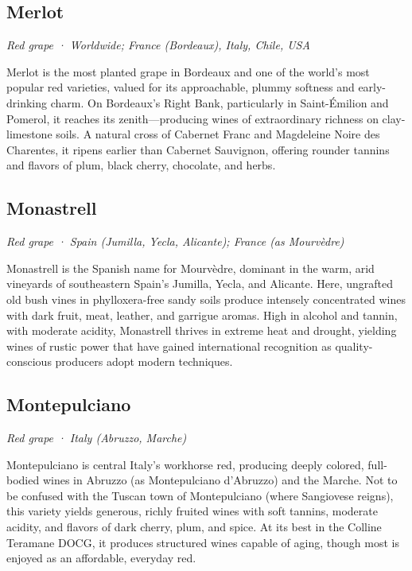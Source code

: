 \subsection*{Merlot}
\textit{Red grape · Worldwide; France (Bordeaux), Italy, Chile, USA}\par\smallskip

Merlot is the most planted grape in Bordeaux and one of the world’s most popular red varieties, valued for its approachable, plummy softness and early-drinking charm. On Bordeaux’s Right Bank, particularly in Saint-Émilion and Pomerol, it reaches its zenith—producing wines of extraordinary richness on clay- limestone soils. A natural cross of Cabernet Franc and Magdeleine Noire des Charentes, it ripens earlier than Cabernet Sauvignon, offering rounder tannins and flavors of plum, black cherry, chocolate, and herbs.

\subsection*{Monastrell}
\textit{Red grape · Spain (Jumilla, Yecla, Alicante); France (as Mourvèdre)}\par\smallskip

Monastrell is the Spanish name for Mourvèdre, dominant in the warm, arid vineyards of southeastern Spain’s Jumilla, Yecla, and Alicante. Here, ungrafted old bush vines in phylloxera-free sandy soils produce intensely concentrated wines with dark fruit, meat, leather, and garrigue aromas. High in alcohol and tannin, with moderate acidity, Monastrell thrives in extreme heat and drought, yielding wines of rustic power that have gained international recognition as quality-conscious producers adopt modern techniques.

\subsection*{Montepulciano}
\textit{Red grape · Italy (Abruzzo, Marche)}\par\smallskip

Montepulciano is central Italy’s workhorse red, producing deeply colored, full-bodied wines in Abruzzo (as Montepulciano d’Abruzzo) and the Marche. Not to be confused with the Tuscan town of Montepulciano (where Sangiovese reigns), this variety yields generous, richly fruited wines with soft tannins, moderate acidity, and flavors of dark cherry, plum, and spice. At its best in the Colline Teramane DOCG, it produces structured wines capable of aging, though most is enjoyed as an affordable, everyday red.

